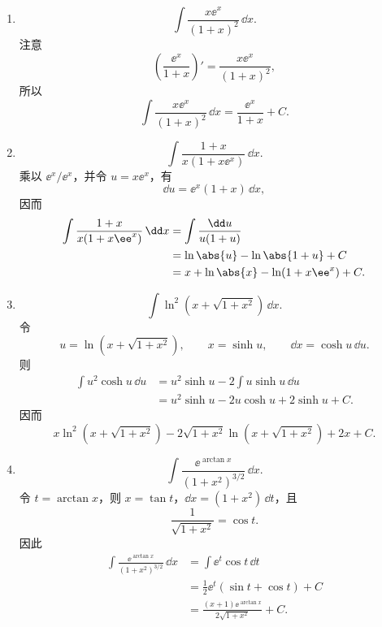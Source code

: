 \begin{enumerate}
\begin{enumerate}[label=(\arabic*)]
    \item
    \[
      \int\frac{x\ee^x}{(1+x)^2}\,\dd x.
    \]
    注意
    \[
      \left(\frac{\ee^x}{1+x}\right)'
      =\frac{x\ee^x}{(1+x)^2},
    \]
    所以
    \[
      \boxed{\int\frac{x\ee^x}{(1+x)^2}\,\dd x=\frac{\ee^x}{1+x}+C}.
    \]

    \item
    \[
      \int\frac{1+x}{x(1+x\ee^x)}\,\dd x.
    \]
    乘以 $\ee^x/\ee^x$，并令 $u=x\ee^x$，有
    \[
      \dd u=\ee^x(1+x)\,\dd x,
    \]
    因而
    \begin{align*}
      \int\frac{1+x}{x(1+x\ee^x)}\,\dd x
      &=\int\frac{\dd u}{u(1+u)}\\
      &=\ln\abs{u}-\ln\abs{1+u}+C\\
      &=x+\ln\abs{x}-\ln(1+x\ee^x)+C.
    \end{align*}

    \item
    \[
      \int\ln^2(x+\sqrt{1+x^2})\,\dd x.
    \]
    令
    \[
      u=\ln(x+\sqrt{1+x^2}),
      \qquad
      x=\sinh u,
      \qquad
      \dd x=\cosh u\,\dd u.
    \]
    则
    \begin{align*}
      \int u^2\cosh u\,\dd u
      &=u^2\sinh u-2\int u\sinh u\,\dd u\\
      &=u^2\sinh u-2u\cosh u+2\sinh u+C.
    \end{align*}
    因而
    \[
      \boxed{x\ln^2(x+\sqrt{1+x^2})
      -2\sqrt{1+x^2}\ln(x+\sqrt{1+x^2})+2x+C}.
    \]

    \item
    \[
      \int\frac{\ee^{\arctan x}}{(1+x^2)^{3/2}}\,\dd x.
    \]
    令 $t=\arctan x$，则 $x=\tan t$，$\dd x=(1+x^2)\,\dd t$，且
    \[
      \frac1{\sqrt{1+x^2}}=\cos t.
    \]
    因此
    \begin{align*}
      \int\frac{\ee^{\arctan x}}{(1+x^2)^{3/2}}\,\dd x
      &=\int\ee^t\cos t\,\dd t\\
      &=\frac12\ee^t(\sin t+\cos t)+C\\
      &=\boxed{\frac{(x+1)\ee^{\arctan x}}{2\sqrt{1+x^2}}+C}.
    \end{align*}
  \end{enumerate}


\end{enumerate}
